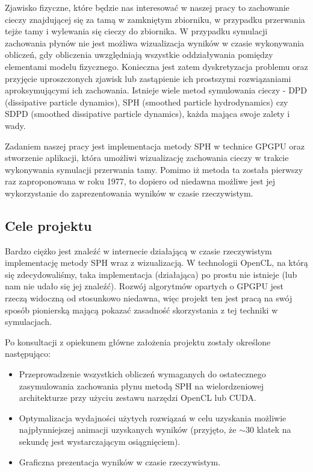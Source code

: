 \documentclass[polish, 12pt]{aghthesis}
\begin{document}
	Zjawisko fizyczne, które będzie nas interesować w naszej pracy to zachowanie cieczy znajdującej się za tamą w zamkniętym zbiorniku, w przypadku przerwania tejże tamy i wylewania się cieczy do zbiornika. W przypadku symulacji zachowania płynów nie jest możliwa wizualizacja wyników w czasie wykonywania obliczeń, gdy obliczenia uwzględniają wszystkie oddziaływania pomiędzy elementami modelu fizycznego. Konieczna jest zatem dyskretyzacja problemu oraz przyjęcie uproszczonych zjawisk lub zastąpienie ich prostszymi rozwiązaniami aproksymującymi ich zachowania. Istnieje wiele metod symulowania cieczy - DPD (dissipative particle dynamics), SPH (smoothed particle hydrodynamics) czy SDPD (smoothed dissipative particle dynamics), każda mająca swoje zalety i wady.

	Zadaniem naszej pracy jest implementacja metody SPH w technice GPGPU oraz stworzenie aplikacji, która umożliwi wizualizację zachowania cieczy w trakcie wykonywania symulacji przerwania tamy. Pomimo iż metoda ta została pierwszy raz zaproponowana w roku 1977, to dopiero od niedawna możliwe jest jej wykorzystanie do zaprezentowania wyników w czasie rzeczywistym.
	
	\subsection{Cele projektu}
	
	Bardzo ciężko jest znaleźć w internecie działającą w czasie rzeczywistym implementację metody SPH wraz z wizualizacją. W technologii OpenCL, na którą się zdecydowaliśmy, taka implementacja (działająca) po prostu nie istnieje (lub nam nie udało się jej znaleźć). Rozwój algorytmów opartych o GPGPU jest rzeczą widoczną od stosunkowo niedawna, więc projekt ten jest pracą na swój sposób pionierską mającą pokazać zasadność skorzystania z tej techniki w symulacjach.
		
	Po konsultacji z opiekunem główne założenia projektu zostały określone następująco:
	
	\begin{itemize}
	
		\item Przeprowadzenie wszystkich obliczeń wymaganych do ostatecznego zasymulowania zachowania płynu metodą SPH na wielordzeniowej architekturze przy użyciu zestawu narzędzi OpenCL lub CUDA.
				
		\item Optymalizacja wydajności użytych rozwiązań w celu uzyskania możliwie najpłynniejszej animacji uzyskanych wyników (przyjęto, że $\sim 30$ klatek na sekundę jest wystarczającym osiągnięciem).
		
		\item Graficzna prezentacja wyników w czasie rzeczywistym.
		
	\end{itemize}
	
\end{document}
